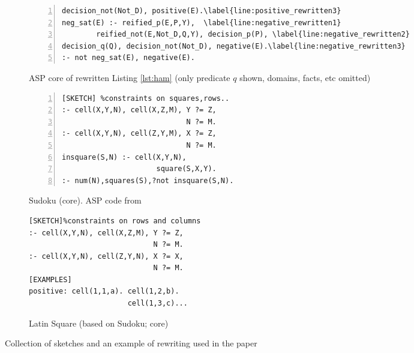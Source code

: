 \begin{figure*}[htb]
\begin{subfigure}[t]{0.66\textwidth}
\begin{Verbatim}[fontsize=\scriptsize,numbers=left,xleftmargin=5.7mm,commandchars=\\\{\}]
               decision_not(Not_D), positive(E).\label{line:positive_rewritten3}
neg_sat(E) :- reified_p(E,P,Y),  \label{line:negative_rewritten1}
        reified_not(E,Not_D,Q,Y), decision_p(P), \label{line:negative_rewritten2}
decision_q(Q), decision_not(Not_D), negative(E).\label{line:negative_rewritten3}
:- not neg_sat(E), negative(E).
\end{Verbatim}
\caption{ASP core of rewritten Listing \protect \ref{lst:ham} (only predicate $q$ shown, domains, facts, etc omitted)} \label{lst:rewriting}
\end{subfigure}
\hrulesep
\begin{subfigure}[t]{0.49\textwidth}
  \renewcommand{\figurename}{Sketch}
  \vspace{2pt}
\begin{Verbatim}[fontsize=\scriptsize,numbers=left,xleftmargin=0mm]
[SKETCH] %constraints on squares,rows..
:- cell(X,Y,N), cell(X,Z,M), Y ?= Z, 
                             N ?= M.
:- cell(X,Y,N), cell(Z,Y,M), X ?= Z, 
                             N ?= M.
insquare(S,N) :- cell(X,Y,N), 
                      square(S,X,Y).
:- num(N),squares(S),?not insquare(S,N). 
\end{Verbatim}
\caption{Sudoku (core). \protect ASP code from \cite{asp_tutorial_sudoku}} \label{lst:sudoku}
\end{subfigure} 
\begin{subfigure}[t]{0.44\textwidth}
  \vspace{2pt}
  \renewcommand{\figurename}{Listing}
\begin{Verbatim}[fontsize=\scriptsize]
[SKETCH]%constraints on rows and columns
:- cell(X,Y,N), cell(X,Z,M), Y ?= Z, 
                             N ?= M.
:- cell(X,Y,N), cell(Z,Y,N), X ?= X,
                             N ?= M.
[EXAMPLES]
positive: cell(1,1,a). cell(1,2,b). 
                       cell(1,3,c)...
\end{Verbatim}
\caption{Latin Square (based on Sudoku; core)} \label{lst:latin_square}
\end{subfigure}

\caption{Collection of sketches and an example of rewriting used in the paper}
\label{fig:table_with_sketches}
\end{figure*}
